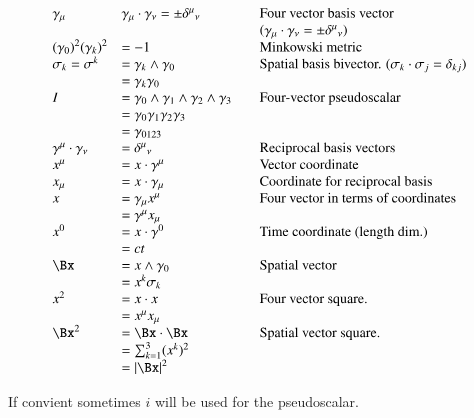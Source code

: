 \begin{equation*}
\begin{array}{l l l}
\gamma_{\mu} & \gamma_{\mu} \cdot \gamma_{\nu} = \pm {\delta^{\mu}}_{\nu} & \quad \mbox{Four vector basis vector} \\
& & \quad \mbox{($\gamma_{\mu} \cdot \gamma_{\nu} = \pm {\delta^{\mu}}_{\nu}$)} \\
{(\gamma_0)}^2 {(\gamma_k)}^2 &= -1 & \quad \mbox{Minkowski metric} \\
\sigma_k = \sigma^k &= \gamma_{k} \wedge \gamma_0 & \quad \mbox{Spatial basis bivector. ($\sigma_k \cdot \sigma_j = \delta_{kj}$)} \\
                    &= \gamma_{k} \gamma_0 & \\
I &= \gamma_{0} \wedge \gamma_1 \wedge \gamma_{2} \wedge \gamma_3 & \quad \mbox{Four-vector pseudoscalar} \\
  &= \gamma_{0} \gamma_1 \gamma_{2} \gamma_3 & \\
  &= \gamma_{0123} \\
\gamma^{\mu} \cdot \gamma_{\nu} &= {\delta^{\mu}}_{\nu} & \quad \mbox{Reciprocal basis vectors} \\
x^{\mu} &= x \cdot \gamma^{\mu} & \quad \mbox{Vector coordinate} \\
x_{\mu} &= x \cdot \gamma_{\mu} & \quad \mbox{Coordinate for reciprocal basis} \\
x &= \gamma_{\mu} x^{\mu} & \quad \mbox{Four vector in terms of coordinates} \\
  &= \gamma^{\mu} x_{\mu} \\
x^{0} &= x \cdot \gamma^0 & \quad \mbox{Time coordinate (length dim.)} \\
      &= c t \\
\Bx &= x \wedge \gamma_0 & \quad \mbox{Spatial vector} \\
    &= x^k \sigma_k \\
x^2 &= x \cdot x & \quad \mbox{Four vector square. } \\
    &= x^\mu x_\mu \\
\Bx^2 &= \Bx \cdot \Bx & \quad \mbox{Spatial vector square. } \\
    &= \sum_{k=1}^3 (x^k)^2 \\
    &= \Abs{\Bx}^2 \\
\end{array}
\end{equation*}

If convient sometimes $i$ will be used for the pseudoscalar.

